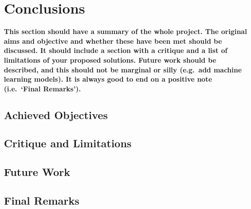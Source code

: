 \chapter{Conclusions}
\textbf{This section should have a summary of the whole project.  The original aims and objective and whether these have been met should be discussed. It should include a section with a critique and a list of limitations of your proposed solutions.  Future work should be described, and this should not be marginal or silly (e.g.\ add machine learning models).  It is always good to end on a positive note (i.e.\ `Final Remarks').}

\section{Achieved Objectives}
\blindtext

\section{Critique and Limitations}
\blindtext

\section{Future Work}
\blindtext

\section{Final Remarks}
\blindtext

